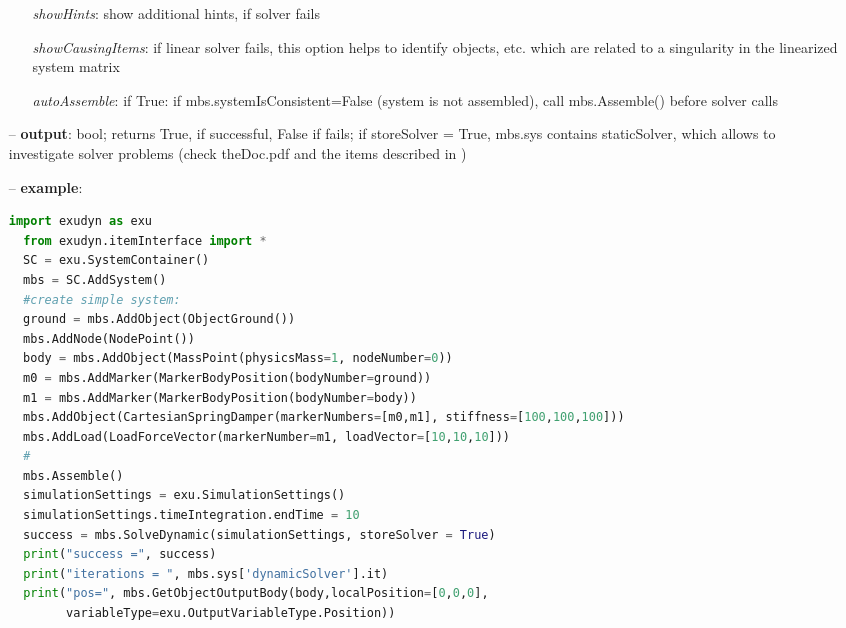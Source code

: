 \begin{itemize}[leftmargin=0.7cm]
\begin{itemize}[leftmargin=1.2cm]
\item[]{\it showHints}: show additional hints, if solver fails
\item[]{\it showCausingItems}: if linear solver fails, this option helps to identify objects, etc. which are related to a singularity in the linearized system matrix
\item[]{\it autoAssemble}: if True: if mbs.systemIsConsistent=False (system is not assembled), call mbs.Assemble() before solver calls
\end{itemize}
\item[--]
{\bf output}: bool; returns True, if successful, False if fails; if storeSolver = True, mbs.sys contains staticSolver, which allows to investigate solver problems (check theDoc.pdf  and the items described in )
\item[--]
{\bf example}: \vspace{-12pt}\ei\begin{lstlisting}[language=Python, xleftmargin=36pt]
  import exudyn as exu
  from exudyn.itemInterface import *
  SC = exu.SystemContainer()
  mbs = SC.AddSystem()
  #create simple system:
  ground = mbs.AddObject(ObjectGround())
  mbs.AddNode(NodePoint())
  body = mbs.AddObject(MassPoint(physicsMass=1, nodeNumber=0))
  m0 = mbs.AddMarker(MarkerBodyPosition(bodyNumber=ground))
  m1 = mbs.AddMarker(MarkerBodyPosition(bodyNumber=body))
  mbs.AddObject(CartesianSpringDamper(markerNumbers=[m0,m1], stiffness=[100,100,100]))
  mbs.AddLoad(LoadForceVector(markerNumber=m1, loadVector=[10,10,10]))
  #
  mbs.Assemble()
  simulationSettings = exu.SimulationSettings()
  simulationSettings.timeIntegration.endTime = 10
  success = mbs.SolveDynamic(simulationSettings, storeSolver = True)
  print("success =", success)
  print("iterations = ", mbs.sys['dynamicSolver'].it)
  print("pos=", mbs.GetObjectOutputBody(body,localPosition=[0,0,0],
        variableType=exu.OutputVariableType.Position))
\end{lstlisting}\vspace{-24pt}\bi\item[]\vspace{-24pt}\vspace{12pt}\end{itemize}
%

